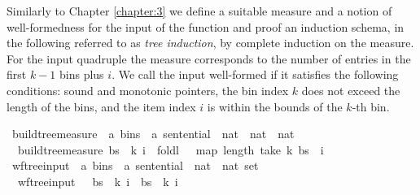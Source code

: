 \begin{isabellebody}
\begin{isamarkuptext}%
Similarly to Chapter \ref{chapter:3} we define a suitable measure and a notion of well-formedness
for the input of the function  and proof an induction schema, in
the following referred to as \textit{tree induction}, by complete induction on the measure.
For the input quadruple  the measure corresponds to the number of entries
in the first $k-1$ bins plus $i$. We call the input well-formed if it satisfies the following
conditions: sound and monotonic pointers, the bin index $k$ does not exceed the length of the bins, and the item
index $i$ is within the bounds of the $k$-th bin.%
\end{isamarkuptext}\isamarkuptrue%
\isamarkupfalse%
\ build{\isacharunderscore}{\kern0pt}tree{\isacharprime}{\kern0pt}{\isacharunderscore}{\kern0pt}measure\ {\isacharcolon}{\kern0pt}{\isacharcolon}{\kern0pt}\ {\isachardoublequoteopen}{\isacharparenleft}{\kern0pt}{\isacharprime}{\kern0pt}a\ bins\ {\isasymtimes}\ {\isacharprime}{\kern0pt}a\ sentential\ {\isasymtimes}\ nat\ {\isasymtimes}\ nat{\isacharparenright}{\kern0pt}\ {\isasymRightarrow}\ nat{\isachardoublequoteclose}\ \isanewline
\ \ {\isachardoublequoteopen}build{\isacharunderscore}{\kern0pt}tree{\isacharprime}{\kern0pt}{\isacharunderscore}{\kern0pt}measure\ {\isacharparenleft}{\kern0pt}bs{\isacharcomma}{\kern0pt}\ {\isasymomega}{\isacharcomma}{\kern0pt}\ k{\isacharcomma}{\kern0pt}\ i{\isacharparenright}{\kern0pt}\ {\isacharequal}{\kern0pt}\ foldl\ {\isacharparenleft}{\kern0pt}{\isacharplus}{\kern0pt}{\isacharparenright}{\kern0pt}\ {}\ {\isacharparenleft}{\kern0pt}map\ length\ {\isacharparenleft}{\kern0pt}take\ k\ bs{\isacharparenright}{\kern0pt}{\isacharparenright}{\kern0pt}\ {\isacharplus}{\kern0pt}\ i{\isachardoublequoteclose}\isanewline
\isanewline
{}\isamarkupfalse%
\ wf{\isacharunderscore}{\kern0pt}tree{\isacharunderscore}{\kern0pt}input\ {\isacharcolon}{\kern0pt}{\isacharcolon}{\kern0pt}\ {\isachardoublequoteopen}{\isacharparenleft}{\kern0pt}{\isacharprime}{\kern0pt}a\ bins\ {\isasymtimes}\ {\isacharprime}{\kern0pt}a\ sentential\ {\isasymtimes}\ nat\ {\isasymtimes}\ nat{\isacharparenright}{\kern0pt}\ set{\isachardoublequoteclose}\ \isanewline
\ \ {\isachardoublequoteopen}wf{\isacharunderscore}{\kern0pt}tree{\isacharunderscore}{\kern0pt}input\ {\isacharequal}{\kern0pt}\ {\isacharbraceleft}{\kern0pt}\ {\isacharparenleft}{\kern0pt}bs{\isacharcomma}{\kern0pt}\ {\isasymomega}{\isacharcomma}{\kern0pt}\ k{\isacharcomma}{\kern0pt}\ i{\isacharparenright}{\kern0pt}\ {\isacharbar}{\kern0pt}\ bs\ {\isasymomega}\ k\ i{\isachardot}{\kern0pt}\isanewline

\end{isabellebody}
